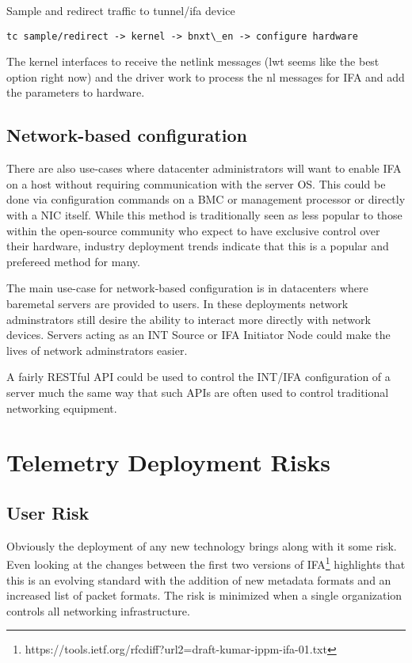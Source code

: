 \documentclass[letterpaper,twocolumn,10pt]{article}
\begin{document}
Sample and redirect traffic to tunnel/ifa device
\tiny
\begin{verbatim}
tc sample/redirect -> kernel -> bnxt\_en -> configure hardware
\end{verbatim}
\normalsize

The kernel interfaces to receive the netlink messages (lwt seems like
the best option right now) and the driver work to process the nl
messages for IFA and add the parameters to hardware.


\subsection{Network-based configuration}

There are also use-cases where datacenter administrators will want to
enable IFA on a host without requiring communication with the server OS.
This could be done via configuration commands on a BMC or management
processor or directly with a NIC itself.  While this method is
traditionally seen as less popular to those within the open-source
community who expect to have exclusive control over their hardware,
industry deployment trends indicate that this is a popular and prefereed
method for many.

The main use-case for network-based configuration is in datacenters
where baremetal servers are provided to users.  In these deployments
network adminstrators still desire the ability to interact more directly
with network devices.  Servers acting as an INT Source or IFA Initiator
Node could make the lives of network adminstrators easier.

A fairly RESTful API could be used to control the INT/IFA configuration
of a server much the same way that such APIs are often used to control
traditional networking equipment.

\section{Telemetry Deployment Risks}

\subsection{User Risk}

Obviously the deployment of any new technology brings along with it some
risk.  Even looking at the changes between the first two versions of
IFA\footnote{https://tools.ietf.org/rfcdiff?url2=draft-kumar-ippm-ifa-01.txt} 
highlights that this is an evolving standard with the addition of new
metadata formats and an increased list of packet formats.  The risk is
minimized when a single organization controls all networking
infrastructure.
\end{document}
